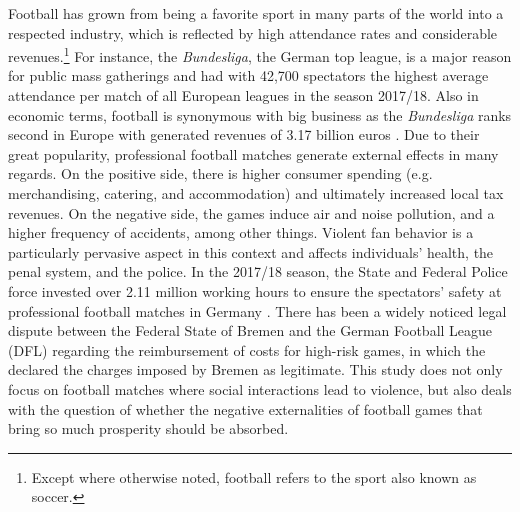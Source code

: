 
Football has grown from being a favorite sport in many parts of the world into a respected industry, which is reflected by high attendance rates and considerable revenues.\footnote{Except where otherwise noted, football refers to the sport also known as soccer.} For instance, the \textit{Bundesliga}, the German top league, is a major reason for public mass gatherings and had with 42,700 spectators the highest average attendance per match of all European leagues in the season 2017/18. Also in economic terms, football is synonymous with big business as the \textit{Bundesliga} ranks second in Europe with generated revenues of 3.17 billion euros \citep{deloitte2019report}. Due to their great popularity, professional football matches generate external effects in many regards. On the positive side, there is higher consumer spending (e.g. merchandising, catering, and accommodation) and ultimately increased local tax revenues. On the negative side, the games induce air and noise pollution, and a higher frequency of accidents, among other things. Violent fan behavior is a particularly pervasive aspect in this context and affects individuals' health, the penal system, and the police. In the 2017/18 season, the State and Federal Police force invested over 2.11 million working hours to ensure the spectators' safety at professional football matches in Germany \citep{zis17_18}. There has been a widely noticed legal dispute between the Federal State of Bremen and the German Football League (DFL) regarding the reimbursement of costs for high-risk games, in which the \cite{fac_2019} declared the charges imposed by Bremen as legitimate. This study does not only focus on football matches where social interactions lead to violence, but also deals with the question of whether the negative externalities of football games that bring so much prosperity should be absorbed. 




